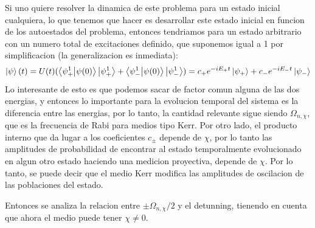 Si uno quiere resolver la dinamica de este problema para un estado inicial cualquiera, lo que tenemos que hacer es desarrollar este estado inicial en funcion de los autoestados del problema, entonces tendriamos para un estado arbitrario con un numero total de excitaciones definido, que suponemos igual a 1 por simplificacion (la generalizacion es inmediata):
\begin{equation}
    \ket{\psi}(t)=U(t)(\braket{\psi_+^1}{\psi(0)}\ket{\psi_+^1}+\braket{\psi_-^1}{\psi(0)}\ket{\psi_-^1})=c_+e^{-iE_+t}\ket{\psi_+}+c_-e^{-iE_-t}\ket{\psi_-}
\end{equation}
Lo interesante de esto es que podemos sacar de factor comun alguna de las dos energias, y entonces lo importante para la evolucion temporal del sistema es la diferencia entre las energias, por lo tanto, la cantidad relevante sigue siendo $\Omega_{n,\chi}$, que es la frecuencia de Rabi para medios tipo Kerr. Por otro lado, el producto interno que da lugar a los coeficientes $c_\pm$ depende de $\chi$, por lo tanto las amplitudes de probabilidad de encontrar al estado temporalmente evolucionado en algun otro estado haciendo una medicion proyectiva, depende de $\chi$. Por lo tanto, se puede decir que el medio Kerr modifica las amplitudes de oscilacion de las poblaciones del estado.

Entonces se analiza la relacion entre $\pm \Omega_{n,\chi}/2$ y el detunning, tienendo en cuenta que ahora el medio puede tener $\chi \neq 0$. 

